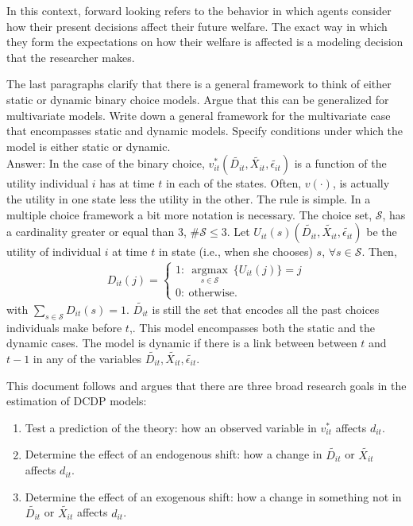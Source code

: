 \begin{remark}
In this context, forward looking refers to the behavior in which agents consider how their present decisions affect their future welfare. The exact way in which they form the expectations on how their welfare is affected is a modeling decision that the researcher makes.
\end{remark}

\begin{exercise}
The last paragraphs clarify that there is a general framework to think of either static or dynamic binary choice models. Argue that this can be generalized for multivariate models. Write down a general framework for the multivariate case that encompasses static and dynamic models. Specify conditions under which the model is either static or dynamic.\\
\noindent Answer:
\noindent In the case of the binary choice, $v_{it}^* \left( \tilde{D_{it}}, \tilde{X_{it}}, \tilde{\epsilon_{it}} \right)$ is a function of the utility individual $i$ has at time $t$ in each of the states. Often, $v(\cdot)$, is actually the utility in one state less the utility in the other. The rule is simple. In a multiple choice framework a bit more notation is necessary. The choice set, $\mathcal{S}$, has a cardinality greater or equal than $3$, $\# \mathcal{S} \leq 3$. Let $U_{it}(s) \left( \tilde{D_{it}}, \tilde{X_{it}}, \tilde{\epsilon_{it}} \right)$ be the utility of individual $i$ at time $t$ in state (i.e., when she chooses) $s$, $\forall s \in \mathcal{S}$. Then,
 \begin{eqnarray}
   D_{it}(j) = \left\{
     \begin{array}{lr}
       1  : \ \underset{s \in \mathcal{S}}{\operatorname{argmax}} \ \{U_{it}(j)\} = j \\
       0  : \ \text{otherwise}. 
     \end{array}
   \right.
\end{eqnarray}
\noindent with $\sum \limits _{s \in \mathcal{S}} D_{it}(s) = 1$. $\tilde{D_{it}}$ is still the set that encodes all the past choices individuals make before $t$,. This model encompasses both the static and the dynamic cases. The model is dynamic if there is a link between between $t$ and $t-1$ in any of the variables $\tilde{D_{it}}, \tilde{X_{it}}, \tilde{\epsilon_{it}}$. 
\end{exercise}

\indent This document follows \citet{keane2011structural} and argues that there are three broad research goals in the estimation of DCDP models:
\begin{enumerate}
\item Test a prediction of the theory: how an observed variable in $v_{it}^*$ affects $d_{it}$.
\item Determine the effect of an endogenous shift: how a change in $\tilde{D_{it}}$ or $\tilde{X_{it}}$ affects $d_{it}$.
\item Determine the effect of an exogenous shift: how a change in something not in $\tilde{D_{it}}$ or $\tilde{X_{it}}$ affects $d_{it}$.
\end{enumerate}

